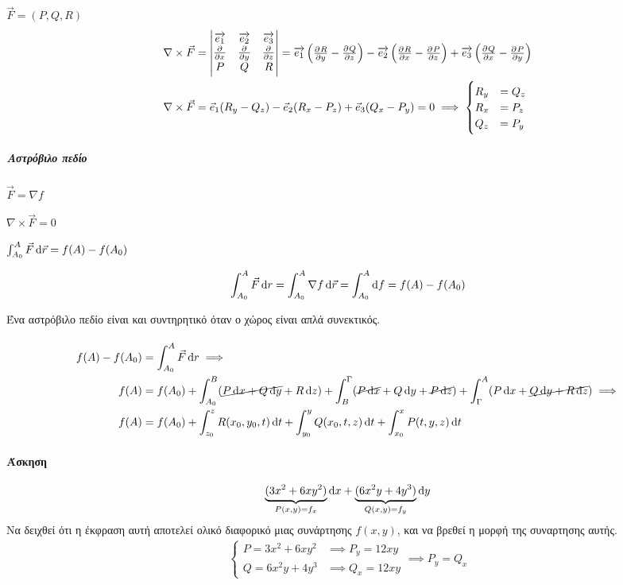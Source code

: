 \documentclass[11pt,a4paper,titlepage]{article}
\begin{document}
\(\vec F = (P,Q,R)\)
\begin{align*}
\nabla \times \vec F &= \left|
\begin{matrix}
\overrightarrow{e_1}&\overrightarrow{e_2}&\overrightarrow{e_3}\\
\pd{}{x}&\pd{}{y}&\pd{}{z}\\
P&Q&R
\end{matrix}
\right|
=
\overrightarrow{e_1}\left(
\pd{R}{y}-\pd{Q}{z}
\right)
-
\overrightarrow{e_2}\left(
\pd{R}{x}-\pd{P}{z}
\right)
+
\overrightarrow{e_3}\left(
\pd{Q}{x}-\pd{P}{y}
\right)\\
\nabla \times \vec F &= \vec e_1 (R_y-Q_z) - \vec e_2 (R_x-P_z) + \vec e_3 (Q_x-P_y) = 0 \implies
\begin{cases}
R_y&=Q_z\\
R_x&=P_z\\
Q_z&=P_y
\end{cases}
\end{align*}

\subparagraph{Αστρόβιλο πεδίο}
\begin{enumparen}
\item \(\vec F = \nabla f\)
\item \(\nabla \times \vec F = 0\)
\item \( \int_{A_0}^A \vec F\dif\vec r = f(A)-f(A_0)\)
\end{enumparen}

\[
\int_{A_0}^A \vec F \dif r = \int_{A_0}^A \nabla f \dif \vec r = \int_{A_0}^A \dif f = f(A)-f(A_0)
\]

Ένα αστρόβιλο πεδίο είναι και συντηρητικό όταν ο χώρος είναι απλά συνεκτικός.

\paragraph{}
\begin{align*}
f(A)-f(A_0)&=
\int_{A_0}^A \vec F \dif r \implies \\ f(A)&=f(A_0)+\int_{A_0}^B (\cancel{P\dif x+Q\dif y} + R\dif z) +
\int_B^\Gamma (\cancel{P\dif x}+Q\dif y +\cancel{P\dif z}) + \int_\Gamma^A (P\dif x + \cancel{Q\dif y+R\dif z})
\implies \\
f(A)&=f(A_0)+\int_{z_0}^z R(x_0,y_0,t)\dif t + \int_{y_0}^y Q(x_0,t,z)\dif t +\int_{x_0}^x P(t,y,z)\dif t
\end{align*}

\paragraph{Άσκηση}
\[
\underbrace{(3x^2+6xy^2)}_{P(x,y)=f_x}\dif x + \underbrace{(6x^2y+4y^3)}_{Q(x,y)=f_y}\dif y
\]
Να δειχθεί ότι η έκφραση αυτή αποτελεί ολικό διαφορικό μιας συνάρτησης \(f(x,y)\), και να βρεθεί η μορφή της συναρτησης αυτής.
\begin{align*}
\begin{cases}
P=3x^2+6xy^2 &\implies P_y = 12xy\\
Q=6x^2y+4y^3 &\implies Q_x=12xy
\end{cases}
\implies P_y=Q_x
\end{align*}
\end{document}
